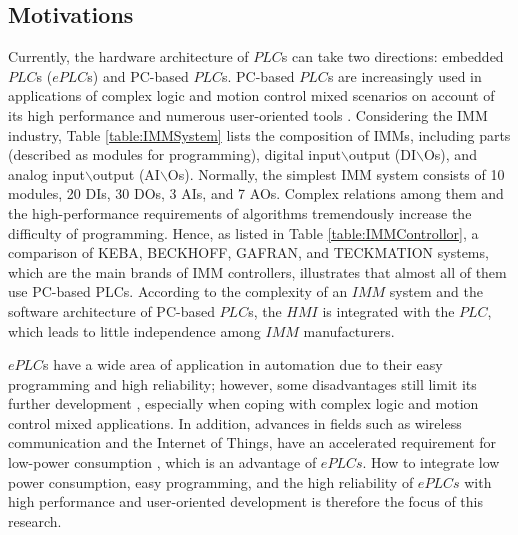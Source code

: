 \documentclass[journal,UTF8]{IEEEtran}
\begin{document}
\subsection{Motivations}
Currently, the hardware architecture of $PLC$s can take two directions: embedded $PLC$s ($ePLC$s) and PC-based $PLC$s. PC-based $PLC$s are increasingly used in applications of complex logic and motion control mixed scenarios on account of its high performance and numerous user-oriented tools \cite{Hossain2014Advanced}. Considering the IMM industry, Table \ref{table:IMMSystem} lists the composition of IMMs, including parts (described as modules for programming), digital input$\backslash$output (DI$\backslash$Os), and analog input$\backslash$output (AI$\backslash$Os). Normally, the simplest IMM system consists of 10 modules, 20 DIs, 30 DOs, 3 AIs, and 7 AOs. Complex relations among them and the high-performance requirements of algorithms tremendously increase the difficulty of programming. Hence, as listed in Table \ref{table:IMMControllor}, a comparison of KEBA, BECKHOFF, GAFRAN, and TECKMATION systems, which are the main brands of IMM controllers, illustrates that almost all of them use PC-based PLCs. According to the complexity of an $IMM$ system and the software architecture of PC-based $PLC$s, the $HMI$ is integrated with the $PLC$, which leads to little independence among $IMM$ manufacturers. 
% 
% 

$ePLC$s have a wide area of application in automation due to their easy programming and high reliability; however, some disadvantages still limit its further development \cite{Hossain2014Advanced}, especially when coping with complex logic and motion control mixed applications. In addition, advances in fields such as wireless communication and the Internet of Things, have an accelerated requirement for low-power consumption \cite{Arshad2017Green}, which is an advantage of $ePLCs$. How to integrate low power consumption, easy programming, and the high reliability of $ePLCs$ with high performance and user-oriented development is therefore the focus of this research.
\end{document}

